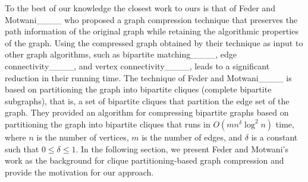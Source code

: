 To the best of our knowledge the closest work to ours is that of Feder and Motwani____ who proposed a graph compression technique that preserves the path information of the original graph while retaining the algorithmic properties of the graph. Using the compressed graph obtained by their technique as input to other graph algorithms, such as bipartite matching____, edge connectivity____, and vertex connectivity____, leads to a significant reduction in their running time.
The technique of Feder and Motwani____ is based on partitioning the graph into bipartite cliques (complete bipartite subgraphs),
that is, a set of bipartite cliques  that partition the edge set of the graph.
They provided an algorithm for compressing bipartite graphs based on partitioning the graph into bipartite cliques that runs in $O(mn^{\delta} \log^2 n)$ time, where $n$ is the number of vertices, $m$ is the number of edges, and $\delta$ is a constant such that $0\leq \delta \leq 1$. 
In the following section, we present Feder and Motwani's work as the background for clique partitioning-based graph compression and provide the motivation for our approach. 